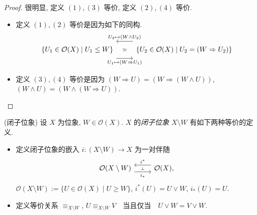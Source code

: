\begin{proof}
	很明显, 定义 $(1),(3)$ 等价, 定义 $(2),(4)$ 等价.
	\begin{itemize}
		\item 定义 $(1),(2)$ 等价是因为如下的同构.
		\[\begin{tikzcd}[ampersand replacement=\&]
			{\{U_1\in\mathcal O(X)\mid U_1\leq W\}} \& {\{U_2\in\mathcal O(X)\mid U_2=(W\Rightarrow U_2)\}}
			\arrow[""{name=0, anchor=center, inner sep=0}, "{U_1\mapsto (W\Rightarrow U_1)}"', shift right=5, from=1-1, to=1-2]
			\arrow[""{name=1, anchor=center, inner sep=0}, "{U_2\mapsto (W\land U_2)}"', shift right=5, from=1-2, to=1-1]
			\arrow["\simeq"{description}, draw=none, from=0, to=1]
		\end{tikzcd}\]
		\item 定义 $(3),(4)$ 等价是因为 $(W\Rightarrow U) = (W\Rightarrow (W\land U))$,
		$(W\land U) = (W\land (W\Rightarrow U))$.
	\end{itemize}
\end{proof}

\begin{definition}
	{(闭子位象)}
	设 $X$ 为位象, $W\in\mathcal O(X)$. $X$ 的\emph{闭子位象} $X\setminus W$ 有如下两种等价的定义.
	\begin{itemize}
		\item 定义闭子位象的嵌入 $i\colon (X\setminus W)\to X$ 为一对伴随
		$$\begin{tikzcd}[ampersand replacement=\&]
			{\mathcal O(X\setminus W)} \& {\mathcal O(X),}
			\arrow[""{name=0, anchor=center, inner sep=0}, "{i^*}"', shift right=2, from=1-2, to=1-1]
			\arrow[""{name=1, anchor=center, inner sep=0}, "{i_*}"', shift right=2, from=1-1, to=1-2]
			\arrow["\dashv"{anchor=center, rotate=-90}, draw=none, from=0, to=1]
		\end{tikzcd}$$
		$\mathcal O(X\setminus W) := \{U\in\mathcal O(X)\mid U\geq W\}$, $i^* (U) = U\lor W$, $i_*(U)=U$.
		\item 定义等价关系 $\equiv_{X\setminus W}$,
		$U\equiv_{X\setminus W} V \quad\text{当且仅当}\quad
		U\lor W = V\lor W$.
	\end{itemize}
\end{definition}

